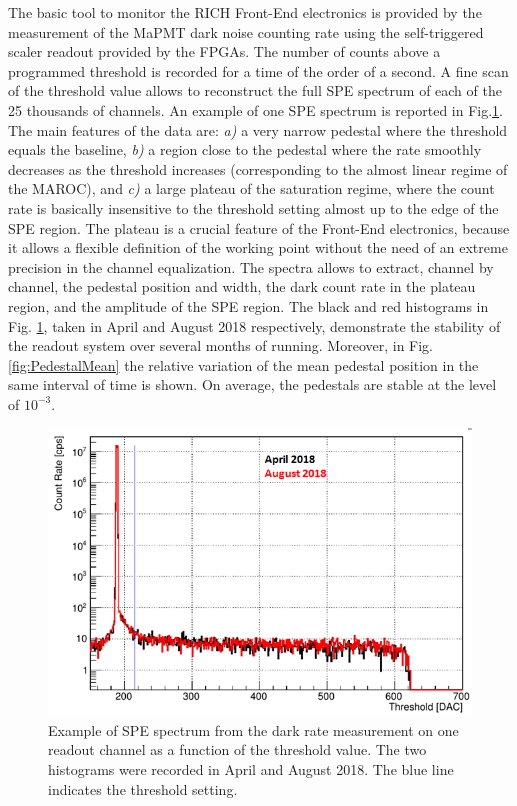 \documentclass[5p,times,twocolumn]{elsarticle}
\def\MaPMT{MaPMT }
\begin{document}
The basic tool to monitor the RICH Front-End electronics is provided by the measurement of the \MaPMT dark noise counting rate using the self-triggered scaler readout provided by the FPGAs. The number of counts above a programmed threshold is recorded for a time of the order of a second. A fine scan of the threshold value allows to reconstruct the full SPE spectrum of each of the 25 thousands of channels. An example of one SPE spectrum is reported in Fig.\ref{fig:SPEdark}. The main features of the data are: {\it{a)}} a very narrow pedestal where the threshold equals the baseline,  {\it{b)}} a region close to the pedestal where the rate smoothly decreases as the threshold increases (corresponding to the almost linear regime of the MAROC), and  {\it{c)}} a large plateau of the saturation regime, where the count rate is basically insensitive to the threshold setting almost up to the edge of the SPE region.
The plateau is a crucial feature of the Front-End electronics, because it allows a flexible definition of the working point without the need of an extreme precision in the channel equalization. The spectra allows to extract, channel by channel, the pedestal position and width, the dark count rate in the plateau region, and the amplitude of the SPE region. The black and red histograms in Fig. \ref{fig:SPEdark}, taken in April and August 2018 respectively, demonstrate the stability of the readout system over several months of running. Moreover, in Fig. \ref{fig:PedestalMean} the relative variation of the mean pedestal position in the same interval of time is shown. On average, the pedestals are stable at the level of $10^{-3}$.



\begin{figure}[t]
\begin{center}
\includegraphics[width=1.0\columnwidth]{SPEdark.png}
\end{center}
\caption{Example of SPE spectrum from the dark rate measurement on one readout channel as a function of the threshold value. The two histograms were recorded in April and August 2018. The blue line indicates the threshold setting.}
\label{fig:SPEdark}
\end{figure}
\end{document}
